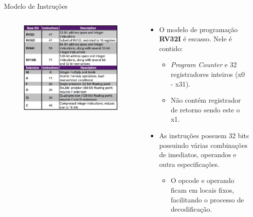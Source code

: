 \documentclass[aspectratio=169]{beamer}
\begin{document}
\begin{frame}{Modelo de Instruções}
	\begin{columns}
		\begin{column}{0.58\textwidth}
			\begin{figure}
				\centering
				\label{fig:bi2}
				\includegraphics[width=1\textwidth]{img/base-instruction.png}
			\end{figure}
		\end{column}
		\begin{column}{0.55\textwidth}
			\begin{itemize}
				\item O modelo de programação \textbf{RV32I} é escasso. Nele é contido:
				\begin{itemize}
					\item \textit{Program Counter} e 32 registradores inteiros (x0 - x31).
					\item Não contém registrador de retorno sendo este o x1.
				\end{itemize}
				\item As instruções possuem 32 bits possuindo várias combinações de imediatos, operandos e outra especificações.
				\begin{itemize}
					\item O opcode e operando ficam em locais fixos, facilitando o processo de decodificação.
				\end{itemize}
			\end{itemize}
		\end{column}
	\end{columns}
\end{frame}
\end{document}
